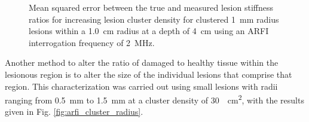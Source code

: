 			\begin{figure}[!htb]
				\centering
				\caption[ARFI imaging-acquired lesion stiffness mean squared error related to small lesion cluster density]{Mean squared error between the true and measured lesion stiffness ratios for increasing lesion cluster density for clustered \SI{1}{\mm} radius lesions within a \SI{1.0}{cm} radius at a depth of \SI{4}{\cm} using an ARFI interrogation frequency of \SI{2}{\MHz}.}
				\label{fig:arfi_cluster_density_mse}
			\end{figure}

			Another method to alter the ratio of damaged to healthy tissue within the lesionous region is to alter the size of the individual lesions that comprise that region. This characterization was carried out using small lesions with radii ranging from \SI{0.5}{\mm} to \SI{1.5}{\mm} at a cluster density of \SI{30}{\per\cm\squared}, with the results given in Fig. \ref{fig:arfi_cluster_radius}.

